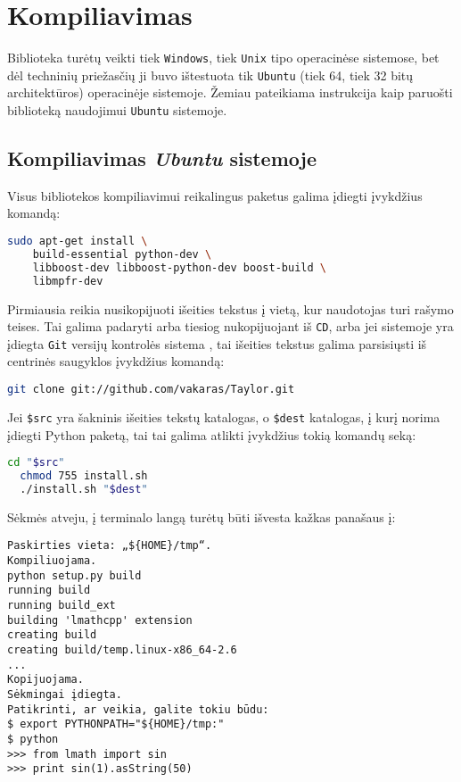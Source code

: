 \chapter{Kompiliavimas}

Biblioteka turėtų veikti tiek \verb|Windows|, tiek 
\verb|Unix| tipo operacinėse sistemose, bet dėl techninių priežasčių
ji buvo ištestuota tik \verb|Ubuntu| (tiek 64, tiek 32 bitų 
architektūros) operacinėje sistemoje. Žemiau pateikiama instrukcija
kaip paruošti biblioteką naudojimui \verb|Ubuntu| sistemoje.

\section{Kompiliavimas \emph{Ubuntu} sistemoje}

Visus bibliotekos kompiliavimui reikalingus paketus galima įdiegti įvykdžius
komandą:
\begin{lstlisting}[language=bash]
  sudo apt-get install \
    build-essential python-dev \
    libboost-dev libboost-python-dev boost-build \
    libmpfr-dev
\end{lstlisting}

Pirmiausia reikia nusikopijuoti išeities tekstus į vietą, kur naudotojas
turi rašymo teises. Tai galima padaryti arba tiesiog nukopijuojant
iš \verb|CD|, arba jei sistemoje yra įdiegta \verb|Git| versijų kontrolės
sistema \cite{git}, tai išeities tekstus galima parsisiųsti iš centrinės
saugyklos įvykdžius komandą:

\begin{lstlisting}[language=bash]
  git clone git://github.com/vakaras/Taylor.git  
\end{lstlisting}

Jei \verb|$src| yra šakninis išeities tekstų katalogas, o \verb|$dest|
katalogas, į kurį norima įdiegti Python paketą, tai tai galima 
atlikti įvykdžius tokią komandų seką:

\begin{lstlisting}[language=bash]
  cd "$src"
  chmod 755 install.sh
  ./install.sh "$dest"
\end{lstlisting}

Sėkmės atveju, į terminalo langą turėtų būti išvesta kažkas panašaus į:
\begin{verbatim}
Paskirties vieta: „${HOME}/tmp“.
Kompiliuojama.
python setup.py build
running build
running build_ext
building 'lmathcpp' extension
creating build
creating build/temp.linux-x86_64-2.6
...
Kopijuojama.
Sėkmingai įdiegta.
Patikrinti, ar veikia, galite tokiu būdu:
$ export PYTHONPATH="${HOME}/tmp:"
$ python
>>> from lmath import sin
>>> print sin(1).asString(50)
\end{verbatim}

